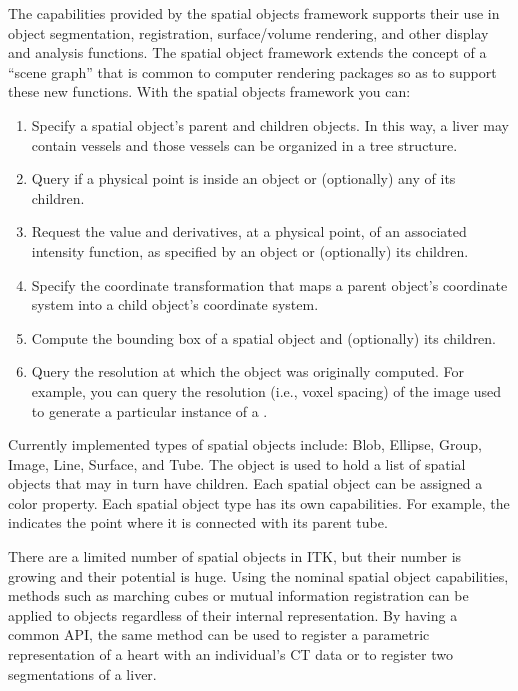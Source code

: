 The capabilities provided by the spatial objects framework supports their use
in object segmentation, registration, surface/volume rendering, and other
display and analysis functions. The spatial object framework extends the
concept of a ``scene graph''  that is common to computer
rendering packages so as to support these new functions. With the spatial
objects framework you can:
\begin{enumerate}

        \item Specify a spatial object's parent and children objects. In
        this way, a liver may contain vessels and those vessels can be
        organized in a tree structure.

        \item Query if a physical point is inside an object or
        (optionally) any of its children.

        \item Request the value and derivatives, at a physical point,
        of an associated intensity function, as specified
        by an object or (optionally) its children.

        \item Specify the coordinate transformation that maps a parent
        object's coordinate system into a child object's coordinate system.

        \item Compute the bounding box of a spatial object and (optionally)
        its children.

        \item Query the resolution at which the object was originally
        computed.  For example, you can query the resolution (i.e., voxel
        spacing) of the image used to generate a particular instance of a
        .
\end{enumerate}

Currently implemented types of spatial objects include: Blob, Ellipse, Group,
Image, Line, Surface, and Tube. The  object is used to hold
a list of spatial objects that may in turn have children. Each spatial
object can be assigned a color property. Each spatial object type has its
own capabilities. For example, the  indicates the
point where it is connected with its parent tube.

There are a limited number of spatial objects in ITK, but
their number is growing and their potential is huge. Using the nominal
spatial object capabilities, methods such as marching cubes or mutual
information registration can be applied to objects regardless of their
internal representation. By having a common API, the same method can be used
to register a parametric representation of a heart with an individual's CT
data or to register two segmentations of a liver.


